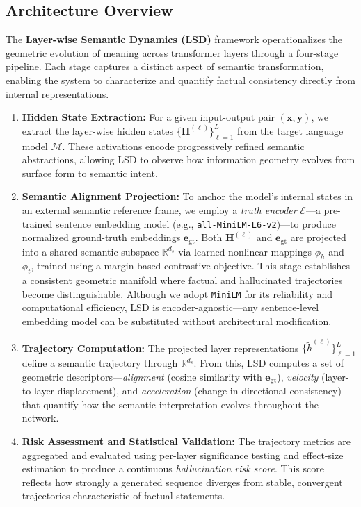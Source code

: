 \documentclass[11pt]{article}
\begin{document}
\subsection{Architecture Overview}

The \textbf{Layer-wise Semantic Dynamics (LSD)} framework operationalizes the geometric evolution of meaning across transformer layers through a four-stage pipeline. Each stage captures a distinct aspect of semantic transformation, enabling the system to characterize and quantify factual consistency directly from internal representations.

\begin{enumerate}[leftmargin=*]
    \item \textbf{Hidden State Extraction:}  
    For a given input-output pair $(\mathbf{x}, \mathbf{y})$, we extract the layer-wise hidden states $\{\mathbf{H}^{(\ell)}\}_{\ell=1}^{L}$ from the target language model $\mathcal{M}$. These activations encode progressively refined semantic abstractions, allowing LSD to observe how information geometry evolves from surface form to semantic intent.
    
    \item \textbf{Semantic Alignment Projection:}  
    To anchor the model’s internal states in an external semantic reference frame, we employ a \emph{truth encoder} $\mathcal{E}$—a pre-trained sentence embedding model (e.g., \texttt{all-MiniLM-L6-v2})—to produce normalized ground-truth embeddings $\mathbf{e}_{\text{gt}}$.  
    Both $\mathbf{H}^{(\ell)}$ and $\mathbf{e}_{\text{gt}}$ are projected into a shared semantic subspace $\mathbb{R}^{d_s}$ via learned nonlinear mappings $\phi_h$ and $\phi_t$, trained using a margin-based contrastive objective.  
    This stage establishes a consistent geometric manifold where factual and hallucinated trajectories become distinguishable.  
    Although we adopt \texttt{MiniLM} for its reliability and computational efficiency, LSD is encoder-agnostic—any sentence-level embedding model can be substituted without architectural modification.
    
    \item \textbf{Trajectory Computation:}  
    The projected layer representations $\{\tilde{h}^{(\ell)}\}_{\ell=1}^{L}$ define a semantic trajectory through $\mathbb{R}^{d_s}$.  
    From this, LSD computes a set of geometric descriptors—\emph{alignment} (cosine similarity with $\mathbf{e}_{\text{gt}}$), \emph{velocity} (layer-to-layer displacement), and \emph{acceleration} (change in directional consistency)—that quantify how the semantic interpretation evolves throughout the network.
    
    \item \textbf{Risk Assessment and Statistical Validation:}  
    The trajectory metrics are aggregated and evaluated using per-layer significance testing and effect-size estimation to produce a continuous \emph{hallucination risk score}.  
    This score reflects how strongly a generated sequence diverges from stable, convergent trajectories characteristic of factual statements.
\end{enumerate}
\end{document}
